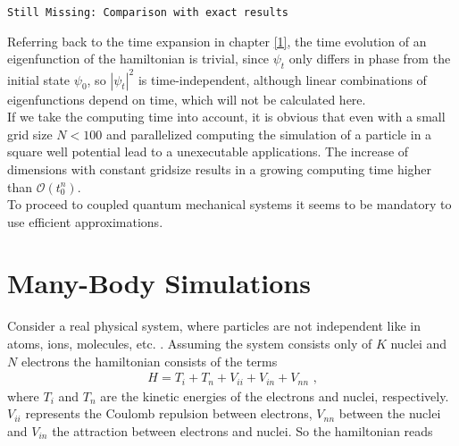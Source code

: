 \documentclass[10pt,a4paper]{article} %
\begin{document}
\begin{lstlisting}
Still Missing: Comparison with exact results
\end{lstlisting}

Referring back to the time expansion in chapter \ref{1}, the time evolution of an eigenfunction of the hamiltonian is trivial, since $\psi_t$ only differs in phase from the initial state $\psi_0$, so ${|\psi_t|}^2$ is time-independent, although linear combinations of eigenfunctions depend on time, which will not be calculated here.\\

If we take the computing time into account, it is obvious that even with a small grid size $N<100$ and parallelized computing the simulation of a particle in a square well potential lead to a unexecutable applications. The increase of dimensions with constant gridsize results in a growing computing time higher than $\mathcal O (t_0^n)$. \\

To proceed to coupled quantum mechanical systems it seems to be mandatory to use efficient approximations.




    \section{Many-Body Simulations}
    
    Consider a real physical system, where particles are not independent like in atoms, ions, molecules, etc. . Assuming the system consists only of $K$ nuclei and $N$ electrons the hamiltonian consists of the terms
\begin{align*}
    H = T_i + T_n+ V_{ii} + V_{in} + V_{nn} \text{ ,}
\end{align*} 
    where $T_i $ and $T_n$ are the kinetic energies of the electrons and nuclei, respectively. $V_{ii}$ represents the Coulomb repulsion between electrons, $V_{nn}$ between the nuclei and $V_{in}$  the attraction between electrons and nuclei. So the hamiltonian reads
    
\end{document}
